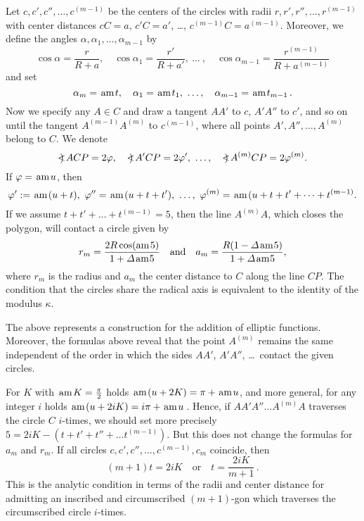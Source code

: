 Let $c,c',c'',\dots,c^{(m-1)}$ be the centers of the circles with radii $r, r',r'',\dots, r^{(m-1)}$ with center distances $cC=a$, $c'C=a'$, \dots, $c^{(m-1)}C = a^{(m-1)}$.
Moreover, we define the angles $\alpha,\alpha_1,\dots,\alpha_{m-1}$ by
\[ \cos\alpha = \frac r{R+a}, \quad \cos\alpha_1 = \frac{r'}{R+a'}, \ \dots \ ,
   \quad \cos\alpha_{m-1} = \frac{r^{(m-1)}}{R+a^{(m-1)}}
\]
and set
\[ \alpha_m = \mskip 2mu\mbox{am}\mskip 2mu t, \quad \alpha_1 = \mskip 2mu\mbox{am}\mskip 2mu t_1, \ \dots, \quad \alpha_{m-1} = \mskip 2mu\mbox{am}\mskip 2mu t_{m-1}\,.
\]    
Now we specify any $A\in C$ and draw a tangent $AA'$ to $c$, $A'A''$ to $c'$, and so on until the tangent $A^{(m-1)}A^{(m)}$ to $c^{(m-1)}$, where all points $A', A'',\dots,A^{(m)}$ belong to $C$.     
We denote
\[ <\mskip-10mu)\mskip4mu ACP = 2\varphi, \quad <\mskip-10mu)\mskip4mu A'CP = 2\varphi', \ \dots, \quad 
    <\mskip-10mu)\mskip4mu A^{(m)}CP = 2\varphi^{(m)}.
\]     
If $\varphi = \mskip 2mu\mbox{am}\mskip 2mu u$, then
\[ \varphi':= \AM(u+t), \ \varphi'' = \AM(u+t+t'), \ \dots, \
   \varphi^{(m)} = \AM(u+t+t'+\dots+t^{(m-1)}.
\]
If we assume $t + t' + \dots + t^{(m-1)} = 5$, then the line $A^{(m)}A$, which closes the polygon, will contact a circle given by
\[  r_m = \frac{2R\cos(\mbox{am}\mskip 2mu 5)}{1 + \varDelta\mskip 2mu\mbox{am}\mskip 1mu 5} \quad \mbox{and} \quad
    a_m = \frac{R(1 - \varDelta\mskip 2mu\mbox{am}\mskip 1mu 5)}{1 + \varDelta\mskip 2mu\mbox{am}\mskip 1mu 5},
\]
where $r_m$ is the radius and $a_m$ the center distance to $C$ along the line $CP$.
The condition that the circles share the radical axis is equivalent to the identity of the modulus $\kappa$.

The above represents a construction for the addition of elliptic functions.
Moreover, the formulas above reveal that the point $A^{(m)}$ remains the same independent of the order in which the sides $AA'$, $A'A''$, \dots\ contact the given circles.

\goodbreak
\bigskip{}

\medskip\noindent
For $K$ with $\mskip 2mu\mbox{am}\mskip 2mu K = \frac{\pi}2$ holds $\mskip 2mu\mbox{am}\mskip 2mu(u+2K) = \pi +\mskip 2mu\mbox{am}\mskip 2mu u$, and more general, for any integer $i$ holds $\mskip 2mu\mbox{am}\mskip 2mu(u+2iK) = i \pi + \mskip 2mu\mbox{am}\mskip 2mu u$\,.
Hence, if $AA'A''\dots A^{(m)}A$ traverses the circle $C$ $i$-times, we should set
more precisely $5 = 2iK - (t+t'+t''+\dots t^{(m-1)})$.
But this does not change the formulas for $a_m$ and $r_m$.
If all circles $c, c', c'',\dots,c^{(m-1)},c_m$ coincide, then
\[  (m+1)t = 2iK \quad \mbox{or}\quad t = \frac{2iK}{m+1}\,.
\]
This is the analytic condition in terms of the radii and center distance for admitting an inscribed and circumscribed $(m+1)$-gon which traverses the circumscribed circle $i$-times.  

